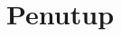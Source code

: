     \newpage

    {\centering
        \renewcommand{\thesection}{\arabic{section}.}
        \section{
            \fontsize{\fontChapterTitle}{0}\selectfont
            Penutup
        }
    }

